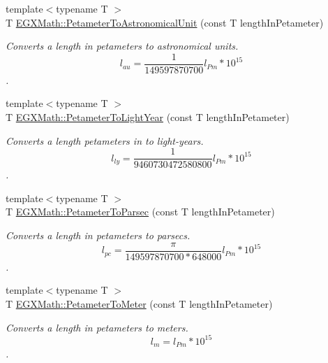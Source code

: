 \begin{DoxyCompactItemize}
\item 
{\footnotesize template$<$typename T $>$ }\\T \mbox{\hyperlink{group___e_g_x_math-_conversions-_length_conversions-_s_i-_petameter-_astronomical_ga8d28d4fb81bdbac19c416be69973fcf9}{E\+G\+X\+Math\+::\+Petameter\+To\+Astronomical\+Unit}} (const T length\+In\+Petameter)
\begin{DoxyCompactList}\small\item\em Converts a length in petameters to astronomical units. \[ l_{au}= \frac{1}{149597870700} l_{Pm} * 10^{15} \]. \end{DoxyCompactList}\item 
{\footnotesize template$<$typename T $>$ }\\T \mbox{\hyperlink{group___e_g_x_math-_conversions-_length_conversions-_s_i-_petameter-_astronomical_gaea87071d89d0f8dbb3b4df023587b82f}{E\+G\+X\+Math\+::\+Petameter\+To\+Light\+Year}} (const T length\+In\+Petameter)
\begin{DoxyCompactList}\small\item\em Converts a length petameters in to light-\/years. \[ l_{ly}= \frac{1}{9460730472580800} l_{Pm} * 10^{15} \]. \end{DoxyCompactList}\item 
{\footnotesize template$<$typename T $>$ }\\T \mbox{\hyperlink{group___e_g_x_math-_conversions-_length_conversions-_s_i-_petameter-_astronomical_ga6579583b24214c285978b0e08e163a9d}{E\+G\+X\+Math\+::\+Petameter\+To\+Parsec}} (const T length\+In\+Petameter)
\begin{DoxyCompactList}\small\item\em Converts a length in petameters to parsecs. \[ l_{pc}=\frac{\pi}{149597870700 * 648000} l_{Pm} * 10^{15} \]. \end{DoxyCompactList}\item 
{\footnotesize template$<$typename T $>$ }\\T \mbox{\hyperlink{group___e_g_x_math-_conversions-_length_conversions-_s_i-_petameter-_s_i_ga604a637d8bd107a2eaa162757b2e813b}{E\+G\+X\+Math\+::\+Petameter\+To\+Meter}} (const T length\+In\+Petameter)
\begin{DoxyCompactList}\small\item\em Converts a length in petameters to meters. \[ l_{m}=l_{Pm} * 10^{15} \]. \end{DoxyCompactList}\item 

\end{DoxyCompactItemize}
